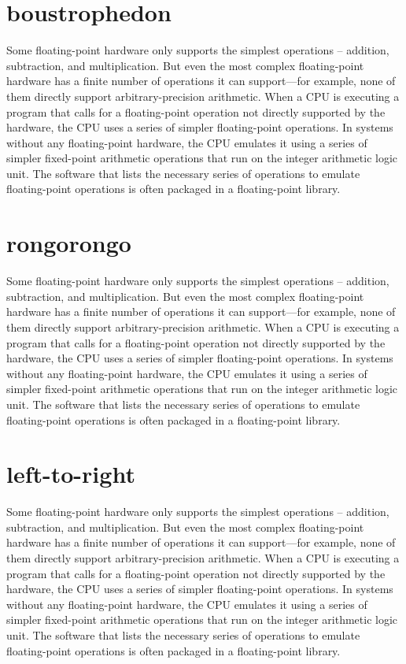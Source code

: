 \documentclass[dvipdfmx]{jsarticle}
\begin{document}
\section*{boustrophedon}
\begin{boustrophedon}
Some floating-point hardware only supports the simplest operations -- addition, subtraction, and multiplication. But even the most complex floating-point hardware has a finite number of operations it can support---for example, none of them directly support arbitrary-precision arithmetic. When a CPU is executing a program that calls for a floating-point operation not directly supported by the hardware, the CPU uses a series of simpler floating-point operations. In systems without any floating-point hardware, the CPU emulates it using a series of simpler fixed-point arithmetic operations that run on the integer arithmetic logic unit. The software that lists the necessary series of operations to emulate floating-point operations is often packaged in a floating-point library.
\end{boustrophedon}

\section*{rongorongo}
\begin{rongorongo}
Some floating-point hardware only supports the simplest operations -- addition, subtraction, and multiplication. But even the most complex floating-point hardware has a finite number of operations it can support---for example, none of them directly support arbitrary-precision arithmetic. When a CPU is executing a program that calls for a floating-point operation not directly supported by the hardware, the CPU uses a series of simpler floating-point operations. In systems without any floating-point hardware, the CPU emulates it using a series of simpler fixed-point arithmetic operations that run on the integer arithmetic logic unit. The software that lists the necessary series of operations to emulate floating-point operations is often packaged in a floating-point library.
\end{rongorongo}

\section*{left-to-right}

Some floating-point hardware only supports the simplest operations -- addition, subtraction, and multiplication. But even the most complex floating-point hardware has a finite number of operations it can support---for example, none of them directly support arbitrary-precision arithmetic. When a CPU is executing a program that calls for a floating-point operation not directly supported by the hardware, the CPU uses a series of simpler floating-point operations. In systems without any floating-point hardware, the CPU emulates it using a series of simpler fixed-point arithmetic operations that run on the integer arithmetic logic unit. The software that lists the necessary series of operations to emulate floating-point operations is often packaged in a floating-point library.
\end{document}
